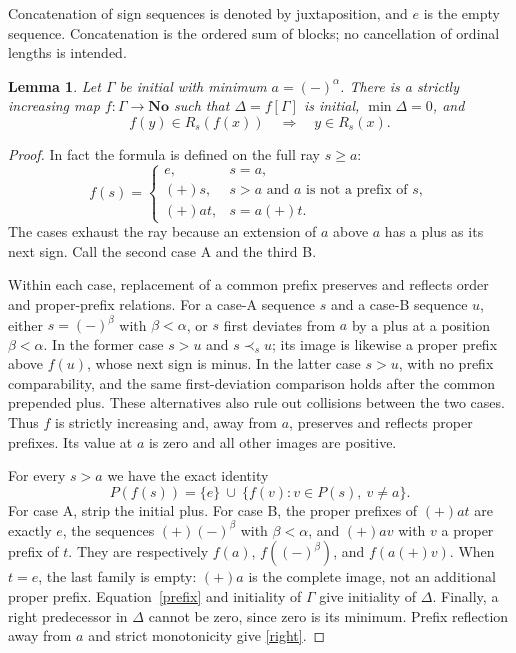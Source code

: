 \documentclass[11pt]{article}
\newcommand{\No}{\mathbf{No}}
\newtheorem{lemma}[theorem]{Lemma}
\begin{document}
Concatenation of sign sequences is denoted by juxtaposition, and $e$
is the empty sequence. Concatenation is the ordered sum of blocks;
no cancellation of ordinal lengths is intended.
\begin{lemma}\label{rotation}
Let $\Gamma$ be initial with minimum $a=(-)^\alpha$.
There is a strictly increasing map $f:\Gamma\to\No$ such that
$\Delta=f[\Gamma]$ is initial, $\min\Delta=0$, and
\begin{equation}\label{right}
 f(y)\in R_s(f(x))\quad\Longrightarrow\quad y\in R_s(x).
\end{equation}
\end{lemma}
\begin{proof}
In fact the formula is defined on the full ray $s\ge a$:
\begin{equation}\label{formula}
 f(s)=
 \begin{cases}
 e,&s=a,\\
 (+)s,&s>a\text{ and }a\text{ is not a prefix of }s,\\
 (+)at,&s=a(+)t.
 \end{cases}
\end{equation}
The cases exhaust the ray because an extension of $a$ above $a$ has
a plus as its next sign. Call the second case A and the third B.

Within each case, replacement of a common prefix preserves and reflects
order and proper-prefix relations. For a case-A sequence $s$ and a
case-B sequence $u$, either $s=(-)^\beta$ with $\beta<\alpha$, or
$s$ first deviates from $a$ by a plus at a position $\beta<\alpha$.
In the former case $s>u$ and $s\prec_s u$; its image is likewise a
proper prefix above $f(u)$, whose next sign is minus. In the latter
case $s>u$, with no prefix comparability, and the same first-deviation
comparison holds after the common prepended plus. These alternatives
also rule out collisions between the two cases.
Thus $f$ is strictly increasing and, away from $a$, preserves and reflects
proper prefixes. Its value at $a$ is zero and all other images are positive.

For every $s>a$ we have the exact identity
\begin{equation}\label{prefix}
 P(f(s))=\{e\}\ \cup\ \{f(v):v\in P(s),\ v\ne a\}.
\end{equation}
For case A, strip the initial plus. For case B, the proper prefixes of
$(+)at$ are exactly $e$, the sequences $(+)(-)^\beta$ with
$\beta<\alpha$, and $(+)av$ with $v$ a proper prefix of $t$.
They are respectively $f(a)$, $f((-)^\beta)$, and $f(a(+)v)$.
When $t=e$, the last family is empty: $(+)a$ is the complete image,
not an additional proper prefix.
Equation~\eqref{prefix} and initiality of $\Gamma$ give initiality of
$\Delta$. Finally, a right predecessor in $\Delta$ cannot be zero,
since zero is its minimum. Prefix reflection away from $a$ and
strict monotonicity give \eqref{right}.
\end{proof}
\end{document}
